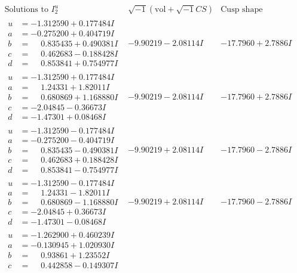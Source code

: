 \documentclass[1p]{elsarticle_modified}
\theoremstyle{definition}
\newcommand{\I}{\sqrt{-1}}
\begin{document}
$$\begin{array}{c|c|c}
\text{Solutions to }I^u_{2}& \I (\text{vol} + \sqrt{-1}CS) & \text{Cusp shape}\\
 \hline 
\begin{aligned}
u &= -1.312590 + 0.177484 I \\
a &= -0.275200 + 0.404719 I \\
b &= \phantom{-}0.835435 + 0.490381 I \\
c &= \phantom{-}0.462683 - 0.188428 I \\
d &= \phantom{-}0.853841 + 0.754977 I\end{aligned}
 & -9.90219 - 2.08114 I & -17.7960 + 2.7886 I \\ \hline\begin{aligned}
u &= -1.312590 + 0.177484 I \\
a &= \phantom{-}1.24331 + 1.82011 I \\
b &= \phantom{-}0.680869 + 1.168880 I \\
c &= -2.04845 - 0.36673 I \\
d &= -1.47301 + 0.08468 I\end{aligned}
 & -9.90219 - 2.08114 I & -17.7960 + 2.7886 I \\ \hline\begin{aligned}
u &= -1.312590 - 0.177484 I \\
a &= -0.275200 - 0.404719 I \\
b &= \phantom{-}0.835435 - 0.490381 I \\
c &= \phantom{-}0.462683 + 0.188428 I \\
d &= \phantom{-}0.853841 - 0.754977 I\end{aligned}
 & -9.90219 + 2.08114 I & -17.7960 - 2.7886 I \\ \hline\begin{aligned}
u &= -1.312590 - 0.177484 I \\
a &= \phantom{-}1.24331 - 1.82011 I \\
b &= \phantom{-}0.680869 - 1.168880 I \\
c &= -2.04845 + 0.36673 I \\
d &= -1.47301 - 0.08468 I\end{aligned}
 & -9.90219 + 2.08114 I & -17.7960 - 2.7886 I \\ \hline\begin{aligned}
u &= -1.262900 + 0.460239 I \\
a &= -0.130945 + 1.020930 I \\
b &= \phantom{-}0.93861 + 1.23552 I \\
c &= \phantom{-}0.442858 - 0.149307 I \\

\end{aligned}
\end{array}$$
\end{document}
